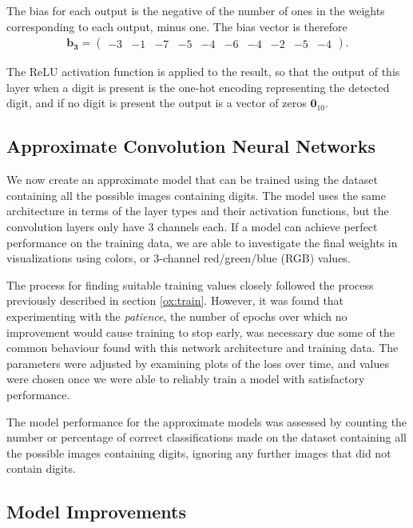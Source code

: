 \documentclass{somasmsc}
\begin{document}
The bias for each output is the negative of the number of ones in the weights corresponding to each output, minus one. The bias vector is therefore
\begin{align*}
    \pmb{b_3} =
    \begin{pmatrix}
        -3 & -1 & -7 & -5 & -4 & -6 & -4 & -2 & -5 & -4
    \end{pmatrix}.
\end{align*}

The ReLU activation function is applied to the result, so that the output of this layer when a digit is present is the one-hot encoding representing the detected digit, and if no digit is present the output is a vector of zeros $\mathbf{0}_{10}$.

\subsection{Approximate Convolution Neural Networks}

We now create an approximate model that can be trained using the dataset containing all the possible images containing digits. The model uses the same architecture in terms of the layer types and their activation functions, but the convolution layers only have 3 channels each. If a model can achieve perfect performance on the training data, we are able to investigate the final weights in visualizations using colors, or 3-channel red/green/blue (RGB) values.

The process for finding suitable training values closely followed the process previously described in section \ref{ox:train}. However, it was found that experimenting with the \textit{patience}, the number of epochs over which no improvement would cause training to stop early, was necessary due some of the common behaviour found with this network architecture and training data. The parameters were adjusted by examining plots of the loss over time, and values were chosen once we were able to reliably train a model with satisfactory performance.

The model performance for the approximate models was assessed by counting the number or percentage of correct classifications made on the dataset containing all the possible images containing digits, ignoring any further images that did not contain digits.

\subsection{Model Improvements}
\end{document}
